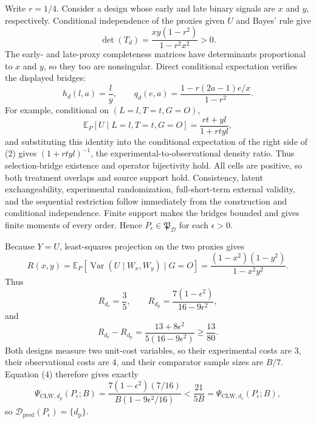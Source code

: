 Write \(r=1/4\).  Consider a design whose early and late binary signals are \(x\) and \(y\), respectively.  Conditional independence of the proxies given \(U\) and Bayes' rule give
\[
 \det(T_d)=\frac{xy(1-r^2)}{1-r^2x^2}>0. \tag{1}
\]
The early- and late-proxy completeness matrices have determinants proportional to \(x\) and \(y\), so they too are nonsingular.  Direct conditional expectation verifies the displayed bridges:
\[
 h_d(l,a)=\frac l y,
 \qquad
 q_d(e,a)=\frac{1-r(2a-1)e/x}{1-r^2}. \tag{2}
\]
For example, conditional on \((L=l,T=t,G=O)\),
\[
 \mathbb E_P[U\mid L=l,T=t,G=O]=\frac{r t+yl}{1+rtyl},
\]
and substituting this identity into the conditional expectation of the right side of (2) gives \((1+rtyl)^{-1}\), the experimental-to-observational density ratio.  Thus selection-bridge existence and operator bijectivity hold.  All cells are positive, so both treatment overlaps and source support hold.  Consistency, latent exchangeability, experimental randomization, full-short-term external validity, and the sequential restriction follow immediately from the construction and conditional independence.  Finite support makes the bridges bounded and gives finite moments of every order.  Hence \(P_{\epsilon}\in\mathfrak P_{\mathcal D}\) for each \(\epsilon>0\).

Because \(Y=U\), least-squares projection on the two proxies gives
\[
 R(x,y)=\mathbb E_P[\operatorname{Var}(U\mid W_x,W_y)\mid G=O]
 =\frac{(1-x^2)(1-y^2)}{1-x^2y^2}. \tag{3}
\]
Thus
\[
 R_{d_{\mathrm e}}=\frac35,
 \qquad
 R_{d_{\mathrm p}}=\frac{7(1-\epsilon^2)}{16-9\epsilon^2},
\]
and
\[
 R_{d_{\mathrm e}}-R_{d_{\mathrm p}}
 =\frac{13+8\epsilon^2}{5(16-9\epsilon^2)}\ge\frac{13}{80}. \tag{4}
\]
Both designs measure two unit-cost variables, so their experimental costs are \(3\), their observational costs are \(4\), and their comparator sample sizes are \(B/7\).  Equation (4) therefore gives exactly
\[
 \Psi_{\mathrm{CLW},d_{\mathrm p}}(P_{\epsilon};B)
 =\frac{7(1-\epsilon^2)(7/16)}{B(1-9\epsilon^2/16)}
 <\frac{21}{5B}
 =\Psi_{\mathrm{CLW},d_{\mathrm e}}(P_{\epsilon};B),
\]
so \(\mathcal D_{\mathrm{pred}}(P_{\epsilon})=\{d_{\mathrm p}\}\).

